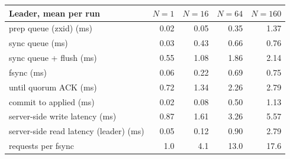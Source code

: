 \begin{tabular}{@{}lrrrr@{}}
\toprule
Leader, mean per run & $N=1$ & $N=16$ & $N=64$ & $N=160$ \\
\midrule
prep queue (zxid) (ms) & 0.02 & 0.05 & 0.35 & 1.37 \\
sync queue (ms) & 0.03 & 0.43 & 0.66 & 0.76 \\
sync queue + flush (ms) & 0.55 & 1.08 & 1.86 & 2.14 \\
fsync (ms) & 0.06 & 0.22 & 0.69 & 0.75 \\
until quorum ACK (ms) & 0.72 & 1.34 & 2.26 & 2.79 \\
commit to applied (ms) & 0.02 & 0.08 & 0.50 & 1.13 \\
server-side write latency (ms) & 0.87 & 1.61 & 3.26 & 5.57 \\
server-side read latency (leader) (ms) & 0.05 & 0.12 & 0.90 & 2.79 \\
requests per fsync & 1.0 & 4.1 & 13.0 & 17.6 \\
\bottomrule
\end{tabular}

